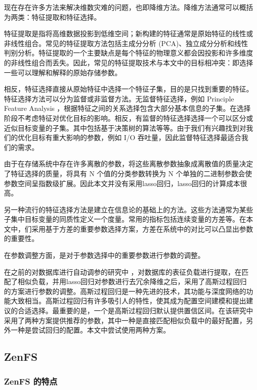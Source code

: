 现在存在许多方法来解决维数灾难的问题，也即降维方法。降维方法通常可以概括为两类：特征提取和特征选择。

特征提取是指将高维数据投影到低维空间；新构建的特征通常是原始特征的线性或非线性组合。常见的特征提取方法包括主成分分析 (PCA)、独立成分分析和线性判别分析。特征提取的一个主要缺点是每个特征的物理意义都会因投影和许多维度的非线性组合而丢失。因此，常见的特征提取技术与本文中的目标相冲突：即选择一些可以理解和解释的原始存储参数。

相反，特征选择直接从原始特征中选择一个特征子集，目的是只找到重要的特征。特征选择方法可以分为监督或非监督方法。无监督特征选择，例如 Principle Feature Analysis ，根据特征之间的关系选择包含大部分基本信息的子集。在选择阶段不考虑特征对优化目标的影响。相反，有监督的特征选择选择一个可以区分或近似目标变量的子集。其中包括基于决策树的算法等等。由于我们有兴趣找到对我们的优化目标有重大影响的参数，例如 I/O 吞吐量，因此监督特征选择最适合我们的需求。

由于在存储系统中存在许多离散的参数，将这些离散参数抽象成离散值的质量决定了特征选择的质量，将具有 N 个值的分类参数转换为 N 个单独的二进制参数会使参数空间呈指数级扩展。因此本文并没有采用lasso回归，lasso回归的计算成本很高。

另一种流行的特征选择方法是建立在信息论的基础上的方法。这些方法通常为某些子集中目标变量的同质性定义一个度量。常用的指标包括连续变量的方差等。在本文中，们采用基于方差的重要参数选择方案，方差在系统中的对比可以凸显出参数的重要性。

在参数调整方面，是对于参数选择中的重要参数进行参数的调整。

在之前的对数据库进行自动调参的研究中 \cite{10.1145/3035918.3064029}，对数据库的表征负载进行提取，在匹配了相似负载，并用lasso回归对参数进行去冗余降维之后，采用了高斯过程回归的方案进行参数的调整。高斯过程回归是一种先进的技术，其功能与深度网络的功能大致相当。高斯过程回归有许多吸引人的特性，使其成为配置空间建模和提出建议的合适选择。最重要的是，一个是高斯过程回归默认提供置信区间。在该研究中采用了两种方案提供推荐的参数，其中一种是直接匹配相似负载中的最好配置，另外一种是尝试回归的配置。本文中尝试使用两种方案。

\subsection{ZenFS}
\label{chap:zenfs}

\subsubsection{ZenFS 的特点}

